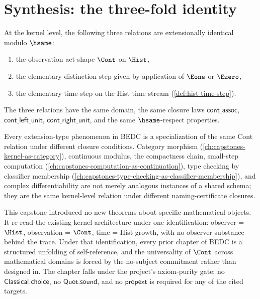 \section{Synthesis: the three-fold identity}
\label{sec:observer-synthesis-threefold-identity}

\begin{theorem}
\label{thm:observer-distinction-time-identity}
At the kernel level, the following three relations are extensionally identical modulo \(\hsame\):
\begin{enumerate}
  \item the observation act-shape \(\Cont\) on \(\Hist\),
  \item the elementary distinction step given by application of \(\Eone\) or \(\Ezero\),
  \item the elementary time-step on the Hist time stream (\autoref{def:hist-time-step}).
\end{enumerate}
The three relations have the same domain, the same closure laws \(\mathsf{cont\_assoc}\), \(\mathsf{cont\_left\_unit}\), \(\mathsf{cont\_right\_unit}\), and the same \(\hsame\)-respect properties.
\end{theorem}
\begin{corollary}
\label{cor:cont-universal-verb}
Every extension-type phenomenon in BEDC is a specialization of the same Cont relation under different closure conditions. Category morphism (\autoref{ch:capstones-kernel-as-category}), continuous modulus, the compactness chain, small-step computation (\autoref{ch:capstones-computation-as-continuation}), type checking by classifier membership (\autoref{ch:capstones-type-checking-as-classifier-membership}), and complex differentiability are not merely analogous instances of a shared schema; they are the same kernel-level relation under different naming-certificate closures.
\end{corollary}
\begin{remark}
\label{rem:closing-implicit-metaphysics}
This capstone introduced no new theorems about specific mathematical objects. It re-read the existing kernel architecture under one identification: observer = \(\Hist\), observation = \(\Cont\), time = Hist growth, with no observer-substance behind the trace. Under that identification, every prior chapter of BEDC is a structured unfolding of self-reference, and the universality of \(\Cont\) across mathematical domains is forced by the no-subject commitment rather than designed in. The chapter falls under the project's axiom-purity gate; no \(\mathsf{Classical.choice}\), no \(\mathsf{Quot.sound}\), and no \(\mathsf{propext}\) is required for any of the cited targets.
\end{remark}
